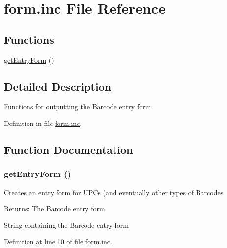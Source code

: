 \hypertarget{form_8inc}{
\section{form.inc File Reference}
\label{form_8inc}
}
\subsection*{Functions}
\begin{CompactItemize}
\item 
\hyperlink{form_8inc_839e205cae656bea01ea99e2de94ef1e}{getEntryForm} ()
\end{CompactItemize}


\subsection{Detailed Description}
Functions for outputting the Barcode entry form 

Definition in file \hyperlink{form_8inc-source}{form.inc}.

\subsection{Function Documentation}
\hypertarget{form_8inc_839e205cae656bea01ea99e2de94ef1e}{
\subsubsection{\setlength{\rightskip}{0pt plus 5cm}getEntryForm ()}}
\label{form_8inc_839e205cae656bea01ea99e2de94ef1e}


Creates an entry form for UPCs (and eventually other types of Barcodes \begin{Desc}
\item[Returns:]The Barcode entry form \end{Desc}


String containing the Barcode entry form 

Definition at line 10 of file form.inc.